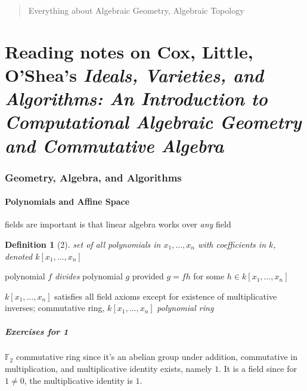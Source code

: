 \documentclass[10pt]{amsart}
\newtheorem{definition}{Definition}
\newcommand{\exercisehead}[1]
  { \smallskip
   \noindent{\small\bf Exercise #1.}
  }
\begin{document}
\begin{multicols*}{2}

  
\setcounter{tocdepth}{1}
\tableofcontents



\begin{abstract}
Everything about Algebraic Geometry, Algebraic Topology

\end{abstract}

\part{Reading notes on Cox, Little, O'Shea's \emph{Ideals, Varieties, and Algorithms: An Introduction to Computational Algebraic Geometry and Commutative Algebra}}

\section{Geometry, Algebra, and Algorithms}

\subsection{Polynomials and Affine Space}

fields are important is that linear algebra works over \emph{any} field

\begin{definition}[2] set of all polynomials in $x_1 , \dots , x_n$ with coefficients in $k$, denoted $k[x_1, \dots , x_n]$

\end{definition}

polynomial $f$ \emph{divides} polynomial $g$ provided $g= fh$ for some $h \in k[x_1, \dots , x_n ]$

$k[x_1, \dots, x_n]$ satisfies all field axioms except for existence of multiplicative inverses; commutative ring, $k[x_1, \dots , x_n]$ \emph{polynomial ring}


\subsubsection*{Exercises for 1 }

\exercisehead{1}
$\mathbb{F}_2$ commutative ring since it's an abelian group under addition, commutative in multiplication, and multiplicative identity exists, namely $1$.  It is a field since for $1\neq 0$, the multiplicative identity is $1$.  


\end{multicols*}
\end{document}
